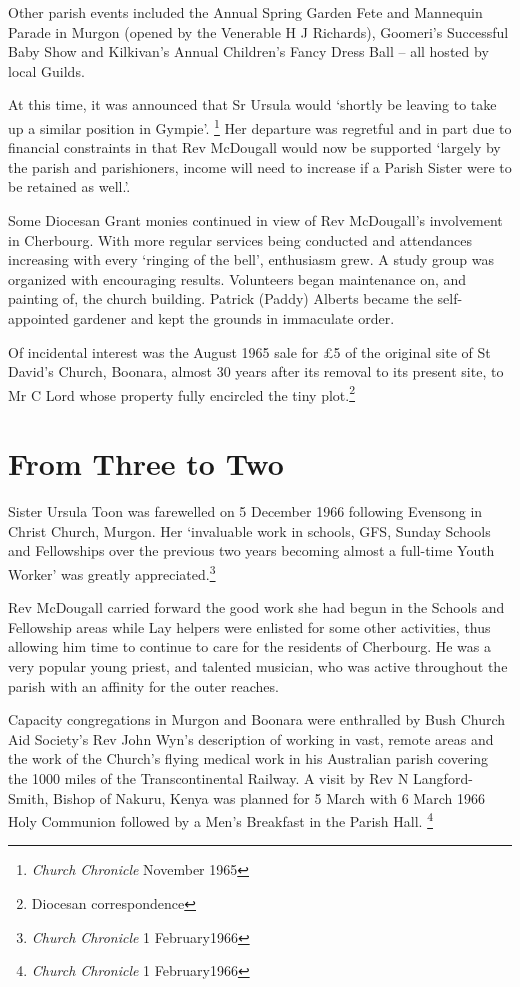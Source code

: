 Other parish events included the Annual Spring Garden Fete and Mannequin
Parade in Murgon (opened by the Venerable H J Richards), Goomeri's
Successful Baby Show and Kilkivan's Annual Children's Fancy Dress Ball
-- all hosted by local Guilds.

At this time, it was announced that Sr Ursula would `shortly be leaving
to take up a similar position in Gympie'. \footnote{\emph{Church
  Chronicle} November 1965} Her departure was regretful and in part due
to financial constraints in that Rev McDougall would now be supported
`largely by the parish and parishioners, income will need to increase if
a Parish Sister were to be retained as well.'.

Some Diocesan Grant monies continued in view of Rev McDougall's
involvement in Cherbourg. With more regular services being conducted and
attendances increasing with every `ringing of the bell', enthusiasm
grew. A study group was organized with encouraging results. Volunteers
began maintenance on, and painting of, the church building. Patrick
(Paddy) Alberts became the self-appointed gardener and kept the grounds
in immaculate order.

Of incidental interest was the August 1965 sale for \pounds5 of the original
site of St David's Church, Boonara, almost 30 years after its removal to
its present site, to Mr C Lord whose property fully encircled the tiny
plot.\footnote{Diocesan correspondence}

\section{From Three to Two}

Sister Ursula Toon was farewelled on 5 December 1966 following Evensong
in Christ Church, Murgon. Her `invaluable work in schools, GFS, Sunday
Schools and Fellowships over the previous two years becoming almost a
full-time Youth Worker' was greatly appreciated.\footnote{\emph{Church
  Chronicle} 1 February1966}

Rev McDougall carried forward the good work she had begun in the Schools
and Fellowship areas while Lay helpers were enlisted for some other
activities, thus allowing him time to continue to care for the residents
of Cherbourg. He was a very popular young priest, and talented musician,
who was active throughout the parish with an affinity for the outer
reaches.

Capacity congregations in Murgon and Boonara were enthralled by Bush
Church Aid Society's Rev John Wyn's description of working in vast,
remote areas and the work of the Church's flying medical work in his
Australian parish covering the 1000 miles of the Transcontinental
Railway. A visit by Rev N Langford-Smith, Bishop of Nakuru, Kenya was
planned for 5 March with 6 March 1966 Holy Communion followed by a Men's
Breakfast in the Parish Hall. \footnote{\emph{Church Chronicle} 1
  February1966}

